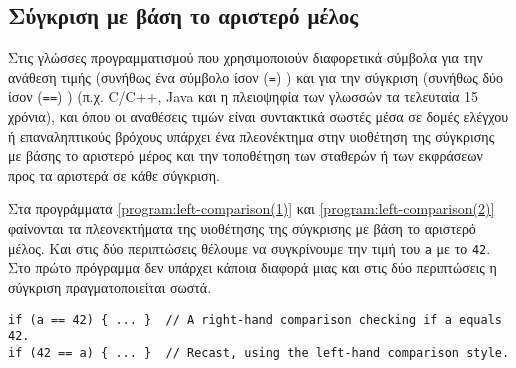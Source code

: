 

\subsection[Σύγκριση με βάση το αριστερό μέλος]{Σύγκριση με βάση το αριστερό μέλος \cite{wikibook:cpp_style,deitel2011c++,programming2003high}} 

Στις γλώσσες προγραμματισμού που χρησιμοποιούν διαφορετικά σύμβολα για την ανάθεση τιμής (συνήθως ένα σύμβολο ίσον (\lstinline!=!) ) και για την σύγκριση  (συνήθως δύο ίσον (\lstinline!==!) ) (π.χ. C/C++, Java και η πλειοψηφία των γλωσσών τα τελευταία 15 χρόνια), και όπου οι αναθέσεις τιμών είναι συντακτικά σωστές μέσα σε δομές ελέγχου ή επαναληπτικούς βρόχους υπάρχει ένα πλεονέκτημα στην υιοθέτηση της σύγκρισης με βάσης το αριστερό μέρος και την τοποθέτηση των σταθερών ή των εκφράσεων προς τα αριστερά σε κάθε σύγκριση.



Στα προγράμματα \ref{program:left-comparison(1)} και \ref{program:left-comparison(2)} φαίνονται τα πλεονεκτήματα της υιοθέτησης της σύγκρισης με βάση το αριστερό μέλος. Και στις δύο περιπτώσεις θέλουμε να συγκρίνουμε την τιμή του \lstinline!a! με το \lstinline!42!. Στο πρώτο πρόγραμμα δεν υπάρχει κάποια διαφορά μιας και στις δύο περιπτώσεις η σύγκριση πραγματοποιείται σωστά. 

\begin{lstlisting}[style=cpp,caption= Παράδειγμα σύγκρισης με βάση το αριστερό μέλος (1), label=program:left-comparison(1)]
if (a == 42) { ... }  // A right-hand comparison checking if a equals 42.
if (42 == a) { ... }  // Recast, using the left-hand comparison style.
\end{lstlisting}

